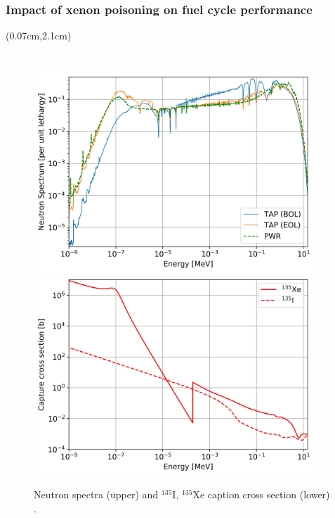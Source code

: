 \begin{frame}
\frametitle{Impact of xenon poisoning on fuel cycle performance}
\begin{textblock*}{12.4cm}(0.07cm,2.1cm) %
	\begin{columns}
		\column[t]{5.5cm}
		\vspace{-5mm}
		\begin{figure}[hbp!] %
			\includegraphics[width=0.94\textwidth]{../dissertation/figures/ch5/tap_vs_pwr_spectrum_2.png}\\
			\vspace{-5mm}
			\hspace{+0.05mm}
			\includegraphics[width=0.94\textwidth]{../dissertation/figures/ch5/i_xe_xs.png}
			\vspace{-3mm}
			\caption{Neutron spectra (upper) and $^{135}$I, $^{135}$Xe caption 
			cross section (lower) \cite{rykhlevskii_impact_2019}.}
		\end{figure}
		

\end{columns}
\end{textblock*}
\end{frame}
